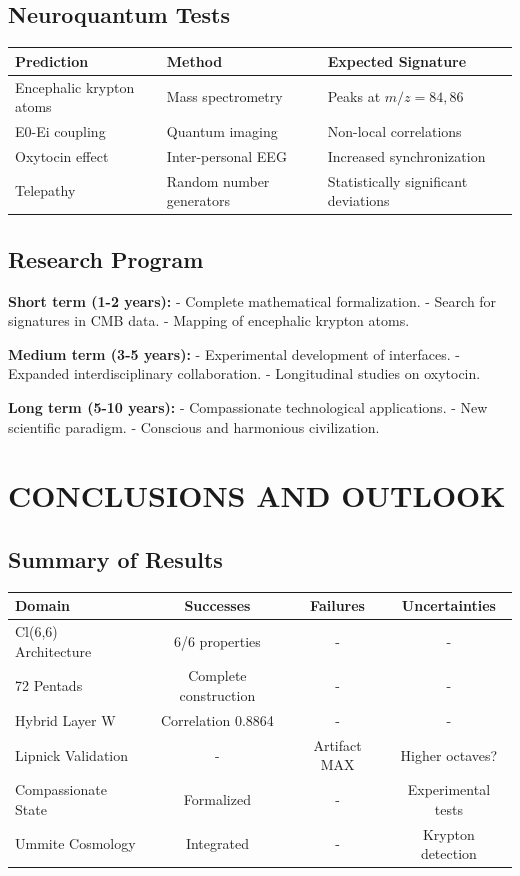 \documentclass[11pt]{article}
\begin{document}
\hypertarget{neuroquantum-tests}{%
\subsection{Neuroquantum Tests}\label{neuroquantum-tests}}

\begin{longtable}{@{}lll@{}}
\toprule
\textbf{Prediction} & \textbf{Method} & \textbf{Expected Signature} \\
\midrule
Encephalic krypton atoms & Mass spectrometry & Peaks at $m/z = 84, 86$ \\
E0-Ei coupling & Quantum imaging & Non-local correlations \\
Oxytocin effect & Inter-personal EEG & Increased synchronization \\
Telepathy & Random number generators & Statistically significant deviations \\
\bottomrule
\end{longtable}

\hypertarget{research-program}{%
\subsection{Research Program}\label{research-program}}

\textbf{Short term (1-2 years):} - Complete mathematical formalization.
- Search for signatures in CMB data. - Mapping of encephalic krypton
atoms.

\textbf{Medium term (3-5 years):} - Experimental development of
interfaces. - Expanded interdisciplinary collaboration. - Longitudinal
studies on oxytocin.

\textbf{Long term (5-10 years):} - Compassionate technological
applications. - New scientific paradigm. - Conscious and harmonious
civilization.

\hypertarget{conclusions-and-outlook}{%
\section{CONCLUSIONS AND OUTLOOK}\label{conclusions-and-outlook}}

\hypertarget{summary-of-results}{%
\subsection{Summary of Results}\label{summary-of-results}}

\begin{longtable}{@{}lccc@{}}
\toprule
\textbf{Domain} & \textbf{Successes} & \textbf{Failures} & \textbf{Uncertainties} \\
\midrule
Cl(6,6) Architecture & 6/6 properties & - & - \\
72 Pentads & Complete construction & - & - \\
Hybrid Layer W & Correlation 0.8864 & - & - \\
Lipnick Validation & - & Artifact MAX & Higher octaves? \\
Compassionate State & Formalized & - & Experimental tests \\
Ummite Cosmology & Integrated & - & Krypton detection \\
\bottomrule
\end{longtable}
\end{document}
